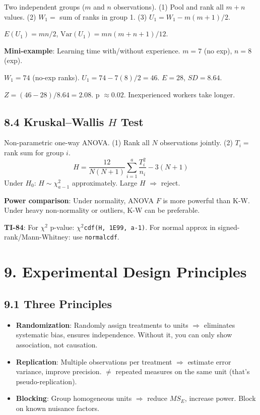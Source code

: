 \documentclass[9pt,letterpaper]{article}
\begin{document}
Two independent groups ($m$ and $n$ observations). (1) Pool and rank all $m+n$ values. (2) $W_1 = $ sum of ranks in group 1. (3) $U_1 = W_1 - m(m+1)/2$.

$E(U_1) = mn/2$, \quad $\text{Var}(U_1) = mn(m+n+1)/12$.

\textbf{Mini-example}: Learning time with/without experience. $m=7$ (no exp), $n=8$ (exp).

$W_1 = 74$ (no-exp ranks). $U_1 = 74 - 7(8)/2 = 46$. $E=28$, $SD=8.64$.

$Z = (46-28)/8.64 = 2.08$. p $\approx 0.02$. Inexperienced workers take longer.

\subsection{8.4 Kruskal--Wallis $H$ Test}

Non-parametric one-way ANOVA. (1) Rank all $N$ observations jointly. (2) $T_i = $ rank sum for group $i$.
\[
H = \frac{12}{N(N+1)}\sum_{i=1}^{a}\frac{T_i^2}{n_i} - 3(N+1)
\]
Under $H_0$: $H \sim \chi^2_{a-1}$ approximately. Large $H$ $\Rightarrow$ reject.

\textbf{Power comparison}: Under normality, ANOVA $F$ is more powerful than K-W. Under heavy non-normality or outliers, K-W can be preferable.

\begin{calcbox}
\textbf{TI-84}: For $\chi^2$ p-value: \texttt{$\chi^2$cdf(H, 1E99, a-1)}. For normal approx in signed-rank/Mann-Whitney: use \texttt{normalcdf}.
\end{calcbox}

\section{9. Experimental Design Principles}

\subsection{9.1 Three Principles}
\begin{itemize}
    \item \textbf{Randomization}: Randomly assign treatments to units $\Rightarrow$ eliminates systematic bias, ensures independence. Without it, you can only show association, not causation.
    \item \textbf{Replication}: Multiple observations per treatment $\Rightarrow$ estimate error variance, improve precision. $\neq$ repeated measures on the same unit (that's pseudo-replication).
    \item \textbf{Blocking}: Group homogeneous units $\Rightarrow$ reduce $MS_E$, increase power. Block on known nuisance factors.
\end{itemize}
\end{document}
